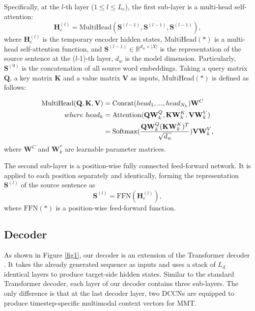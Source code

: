 \documentclass[sigconf]{acmart}
\begin{document}
Specifically,
at the $l$-th layer ($1$$\leq$$l$$\leq$$L_{e}$),
the first sub-layer is a multi-head self-attention: 
\begin{equation} 
\mathbf{H}^{(l)}_e = \mathrm{MultiHead}(\mathbf{S}^{(l-1)}, \mathbf{S}^{(l-1)}, \mathbf{S}^{(l-1)}), 
\end{equation} 
where $\mathbf{H}^{(l)}_e$ is the temporary encoder hidden states, 
$\mathrm{MultiHead}(*)$ is a multi-head self-attention function, 
and $\mathbf{S}^{(l-1)}$$\in$$\mathbb{R}^{d_w\times |X|}$ is the representation of the source sentence at the ($l$-1)-th layer, $d_w$ is the model dimension.
Particularly,
$\mathbf{S}^{(0)}$ is the concatenation of all source word embeddings. 
Taking a query matrix $\mathbf{Q}$, a key matrix $\mathbf{K}$ and a value matrix $\mathbf{V}$ as inputs, 
$\mathrm{MultiHead}(*)$ is defined as follows:


\begin{align}
\mathrm{MultiHead}(\mathbf{Q},\mathbf{K},\mathbf{V})&=\mathrm{Concat}({head}_1,...,{head}_{N_h})\mathbf{W}^C \\
where~{head}_k&=\mathrm{Attention}(\mathbf{QW}_k^Q,\mathbf{KW}_k^K,\mathbf{VW}_k^V) \notag \\
&=\mathrm{Softmax}(\frac{\mathbf{QW}_k^Q(\mathbf{KW}_k^K)^T}{\sqrt{d_w}})\mathbf{VW}_k^V, \notag
\end{align}
where $\mathbf{W}^C$ and $\mathbf{W}^*_k$ are learnable parameter matrices.


The second sub-layer is a position-wise fully connected feed-forward network. It is applied to each position separately and identically,
forming the representation $\mathbf{S}^{(l)}$ of the source sentence as
\begin{equation}
\mathbf{S}^{(l)} = \mathrm{FFN}(\textbf{H}^{(l)}_e),
\end{equation}
where $\mathrm{FFN}(*)$ is a position-wise feed-forward function.


\subsection{Decoder}


As shown in Figure \ref{fig1},
our decoder is an extension of the Transformer decoder \cite{vaswani2017attention}.
It takes the already generated sequence as inputs and uses a stack of $L_d$ identical layers to produce target-side hidden states.
Similar to the standard Transformer decoder, each layer of our decoder contains three sub-layers. 
The only difference is that at the last decoder layer,  
two DCCNs are equipped to produce timestep-specific multimodal context vectors for MMT.
\end{document}

